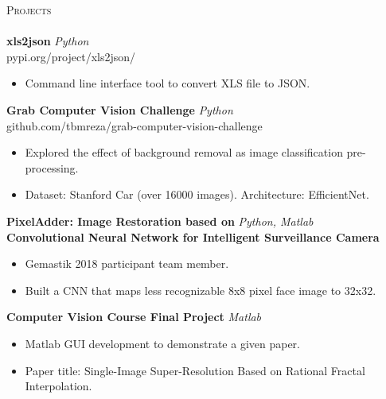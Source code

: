 \documentclass[a4paper]{article}
\newcommand{\lineunder} {
    \vspace*{-8pt} \\
    \hspace*{-18pt} \hrulefill \\
}
\newcommand{\header} [1] {
    {\hspace*{-18pt}\vspace*{6pt} \textsc{#1}}
    \vspace*{-6pt} \lineunder
}
\begin{document}
\header{Projects}
{\textbf{xls2json}} \hfill {\sl Python}\\pypi.org/project/xls2json/\\

\vspace{-1mm}
\begin{itemize} \itemsep 1pt
	\item Command line interface tool to convert XLS file to JSON.  
\end{itemize}

\vspace*{2mm}

{\textbf{Grab Computer Vision Challenge}} \hfill {\sl Python}\\github.com/tbmreza/grab-computer-vision-challenge\\

\vspace{-1mm}
\begin{itemize} \itemsep 1pt
	\item Explored the effect of background removal as image classification pre-processing.
	\item Dataset: Stanford Car (over 16000 images). Architecture: EfficientNet.
  
\end{itemize}

\vspace*{2mm}

{\textbf{PixelAdder: Image Restoration based on
}} \hfill {\sl Python, Matlab}\\
{\textbf{Convolutional Neural Network for Intelligent Surveillance Camera}}


\vspace{-1mm}
\begin{itemize} \itemsep 1pt
	\item Gemastik 2018 participant team member.
  \item Built a CNN that maps less recognizable 8x8 pixel face image to 32x32.
  
  
\end{itemize}


\vspace*{2mm}

{\textbf{Computer Vision Course Final Project}} \hfill {\sl Matlab}\\

\vspace{-1mm}
\begin{itemize} \itemsep 1pt
	\item Matlab GUI development to demonstrate a given paper.
  \item Paper title: Single-Image Super-Resolution Based on Rational Fractal Interpolation.
  
\end{itemize}
\end{document}
